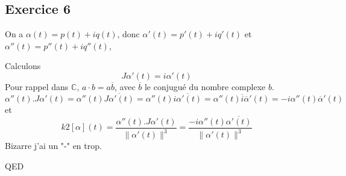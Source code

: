 \documentclass[]{book}
\theoremstyle{definition}
\newcommand{\bb}[1]{\mathbb{#1}}
\newcommand{\C}{\bb{C}}
\begin{document}
\subsection*{Exercice 6}
On a  $\alpha(t) = p(t) + iq(t)$, donc $\alpha'(t) = p'(t) + iq'(t)$ et $\alpha''(t) = p''(t) + iq''(t)$,

Calculons
$$
J\alpha'(t) = i\alpha'(t)
$$
Pour rappel dans $\C$, $a \cdot b = a \overline{b}$, avec $\overline{b}$ le conjugu\'e du nombre complexe $b$.
$$
\alpha''(t).J\alpha'(t) = \alpha''(t)\overline{J\alpha'(t)} = \alpha''(t)\overline{i\alpha'(t)} = \alpha''(t)\overline{i}\overline{\alpha}'(t) = -i\alpha''(t)\overline{\alpha}'(t)  
$$
et 
$$
k2[\alpha](t) = \frac{\alpha''(t).J\alpha'(t)}{\lVert \alpha'(t) \rVert^3} = \frac{-i\alpha''(t)\overline{\alpha'(t)}}{\lVert \alpha'(t) \rVert^3}
$$
Bizarre j'ai un "-" en trop.

QED
\end{document}
